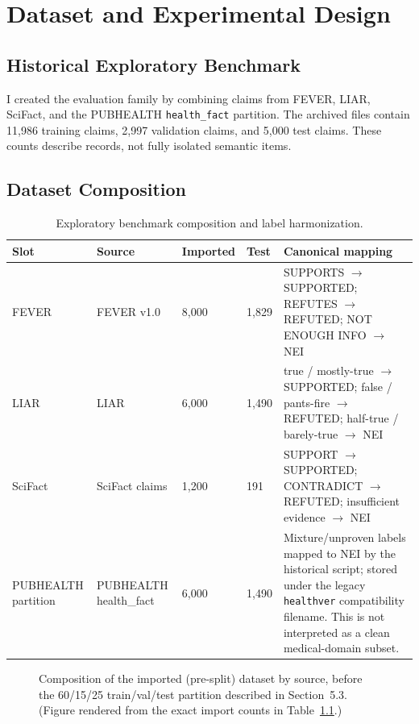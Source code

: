 \documentclass[12pt,a4paper,openany]{report}
\begin{document}
\chapter{Dataset and Experimental Design}
\section{Historical Exploratory Benchmark}
I created the evaluation family by combining claims from FEVER, LIAR, SciFact, and the PUBHEALTH \texttt{health\_fact} partition. The archived files contain 11{,}986 training claims, 2{,}997 validation claims, and 5{,}000 test claims. These counts describe records, not fully isolated semantic items.

\section{Dataset Composition}
\begin{table}[H]
\centering
\caption{Exploratory benchmark composition and label harmonization.}
\label{tab:composition}
\small
\begin{tabularx}{\textwidth}{p{1.6cm}p{1.8cm}p{1.3cm}p{1.1cm}X}
\toprule
Slot & Source & Imported & Test & Canonical mapping \\
\midrule
FEVER & FEVER v1.0 & 8{,}000 & 1{,}829 & SUPPORTS $\to$ SUPPORTED; REFUTES $\to$ REFUTED; NOT ENOUGH INFO $\to$ NEI \\
LIAR & LIAR & 6{,}000 & 1{,}490 & true / mostly-true $\to$ SUPPORTED; false / pants-fire $\to$ REFUTED; half-true / barely-true $\to$ NEI \\
SciFact & SciFact claims & 1{,}200 & 191 & SUPPORT $\to$ SUPPORTED; CONTRADICT $\to$ REFUTED; insufficient evidence $\to$ NEI \\
PUBHEALTH partition & PUBHEALTH health\_fact & 6{,}000 & 1{,}490 & Mixture/unproven labels mapped to NEI by the historical script; stored under the legacy \texttt{healthver} compatibility filename. This is not interpreted as a clean medical-domain subset. \\
\bottomrule
\end{tabularx}
\end{table}

\begin{figure}[H]
\centering
{}
\caption{Composition of the imported (pre-split) dataset by source, before the 60/15/25 train/val/test partition described in Section~5.3. (Figure rendered from the exact import counts in Table~\ref{tab:composition}.)}
\label{fig:dataset-pie}
\end{figure}
\end{document}
